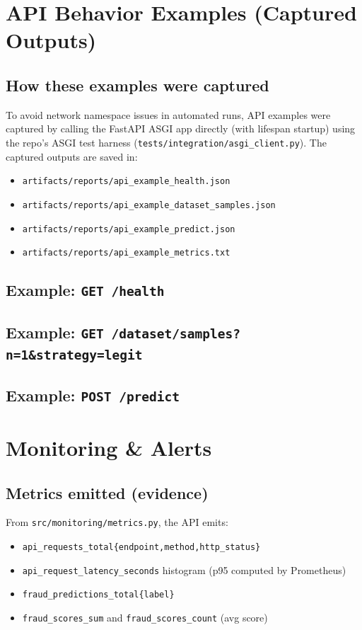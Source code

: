 \documentclass[11pt]{article}
\newcommand{\code}[1]{\texttt{#1}}
\begin{document}
\section{API Behavior Examples (Captured Outputs)}
\subsection{How these examples were captured}
To avoid network namespace issues in automated runs, API examples were captured by calling the FastAPI ASGI app directly (with lifespan startup) using the repo's ASGI test harness (\code{tests/integration/asgi_client.py}). The captured outputs are saved in:
\begin{itemize}
  \item \code{artifacts/reports/api_example_health.json}
  \item \code{artifacts/reports/api_example_dataset_samples.json}
  \item \code{artifacts/reports/api_example_predict.json}
  \item \code{artifacts/reports/api_example_metrics.txt}
\end{itemize}

\subsection{Example: \code{GET /health}}

\subsection{Example: \code{GET /dataset/samples?n=1\&strategy=legit}}

\subsection{Example: \code{POST /predict}}


\section{Monitoring \& Alerts}
\subsection{Metrics emitted (evidence)}
From \code{src/monitoring/metrics.py}, the API emits:
\begin{itemize}
  \item \code{api_requests_total\{endpoint,method,http_status\}}
  \item \code{api_request_latency_seconds} histogram (p95 computed by Prometheus)
  \item \code{fraud_predictions_total\{label\}}
  \item \code{fraud_scores_sum} and \code{fraud_scores_count} (avg score)
\end{itemize}
\end{document}
